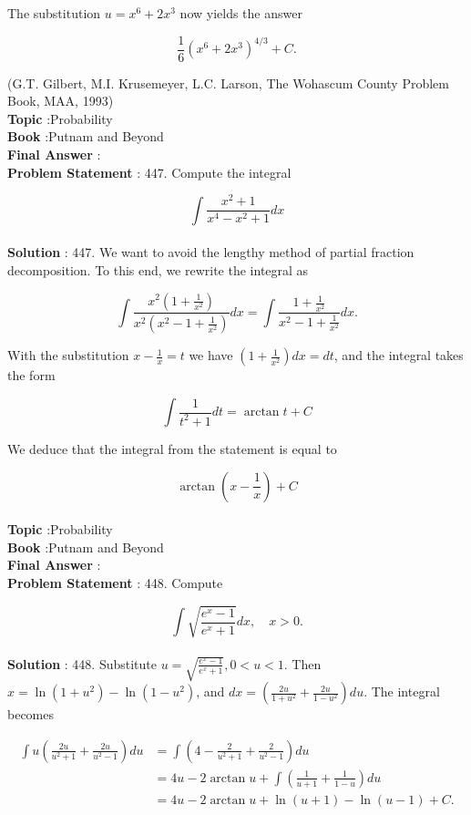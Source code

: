\documentclass[10pt]{article}
\begin{document}
The substitution $u=x^{6}+2 x^{3}$ now yields the answer

$$
\frac{1}{6}\left(x^{6}+2 x^{3}\right)^{4 / 3}+C .
$$

(G.T. Gilbert, M.I. Krusemeyer, L.C. Larson, The Wohascum County Problem Book, MAA, 1993)
\\
\textbf{Topic} :Probability\\
\textbf{Book} :Putnam and Beyond\\
\textbf{Final Answer} :\\


\textbf{Problem Statement} :
447. Compute the integral

$$
\int \frac{x^{2}+1}{x^{4}-x^{2}+1} d x
$$
\\
\textbf{Solution} :
447. We want to avoid the lengthy method of partial fraction decomposition. To this end, we rewrite the integral as

$$
\int \frac{x^{2}\left(1+\frac{1}{x^{2}}\right)}{x^{2}\left(x^{2}-1+\frac{1}{x^{2}}\right)} d x=\int \frac{1+\frac{1}{x^{2}}}{x^{2}-1+\frac{1}{x^{2}}} d x .
$$

With the substitution $x-\frac{1}{x}=t$ we have $\left(1+\frac{1}{x^{2}}\right) d x=d t$, and the integral takes the form

$$
\int \frac{1}{t^{2}+1} d t=\arctan t+C
$$

We deduce that the integral from the statement is equal to

$$
\arctan \left(x-\frac{1}{x}\right)+C
$$
\\
\textbf{Topic} :Probability\\
\textbf{Book} :Putnam and Beyond\\
\textbf{Final Answer} :\\


\textbf{Problem Statement} :
448. Compute

$$
\int \sqrt{\frac{e^{x}-1}{e^{x}+1}} d x, \quad x>0 .
$$
\\
\textbf{Solution} :
448. Substitute $u=\sqrt{\frac{e^{x}-1}{e^{x}+1}}, 0<u<1$. Then $x=\ln \left(1+u^{2}\right)-\ln \left(1-u^{2}\right)$, and $d x=\left(\frac{2 u}{1+u^{2}}+\frac{2 u}{1-u^{2}}\right) d u$. The integral becomes

$$
\begin{aligned}
\int u\left(\frac{2 u}{u^{2}+1}+\frac{2 u}{u^{2}-1}\right) d u &=\int\left(4-\frac{2}{u^{2}+1}+\frac{2}{u^{2}-1}\right) d u \\
&=4 u-2 \arctan u+\int\left(\frac{1}{u+1}+\frac{1}{1-u}\right) d u \\
&=4 u-2 \arctan u+\ln (u+1)-\ln (u-1)+C .
\end{aligned}
$$
\end{document}
